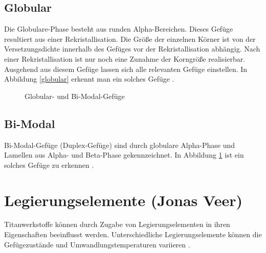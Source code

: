 \documentclass[a4paper, 11pt]{tubsreprt}
\begin{document}
\subsection{Globular}
Die Globulare-Phase besteht aus runden Alpha-Bereichen. Dieses Gefüge resultiert aus einer Rekristallisation. Die Größe der einzelnen Körner ist von der Versetzungsdichte innerhalb des Gefüges vor der Rekristallisation abhängig. Nach einer Rekristallisation ist nur noch eine Zunahme der Korngröße realisierbar. Ausgehend aus diesem Gefüge lassen sich alle relevanten Gefüge einstellen. In Abbildung \ref{globular} erkennt man ein solches Gefüge \cite{Luetjering2007}. 
\begin{figure} %
\caption{Globular- und Bi-Modal-Gefüge}
\label{globular}
\label{bimodal}
\end{figure}

\subsection{Bi-Modal}
Bi-Modal-Gefüge (Duplex-Gefüge) sind durch globulare Alpha-Phase und Lamellen aus Alpha- und Beta-Phase gekennzeichnet. In Abbildung \ref{bimodal} ist ein solches Gefüge zu erkennen \cite{Luetjering2007}. 

\newpage
\section{Legierungselemente (Jonas Veer)}
Titanwerkstoffe können durch Zugabe von Legierungselementen in ihren Eigenschaften beeinflusst werden. 
Unterschiedliche Legierungselemente können die Gefügezustände und Umwandlungstemperaturen variieren \cite{Luetjering2007}.
\end{document}
